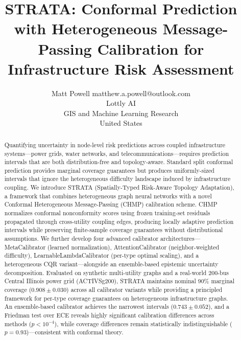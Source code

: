 \documentclass[twoside,11pt]{article}
\begin{document}
\title{STRATA: Conformal Prediction with Heterogeneous Message-Passing Calibration for Infrastructure Risk Assessment}

\author{\name Matt Powell \email matthew.a.powell@outlook.com \\
        \addr Lottly AI\\
        GIS and Machine Learning Research\\
        United States}


\maketitle

\begin{abstract}%
Quantifying uncertainty in node-level risk predictions across coupled infrastructure systems—power grids, water networks, and telecommunications—requires prediction intervals that are both distribution-free and topology-aware. Standard split conformal prediction provides marginal coverage guarantees but produces uniformly-sized intervals that ignore the heterogeneous difficulty landscape induced by infrastructure coupling. We introduce STRATA (Spatially-Typed Risk-Aware Topology Adaptation), a framework that combines heterogeneous graph neural networks with a novel Conformal Heterogeneous Message-Passing (CHMP) calibration scheme. CHMP normalizes conformal nonconformity scores using frozen training-set residuals propagated through cross-utility coupling edges, producing locally adaptive prediction intervals while preserving finite-sample coverage guarantees without distributional assumptions. We further develop four advanced calibrator architectures—MetaCalibrator (learned normalization), AttentionCalibrator (neighbor-weighted difficulty), LearnableLambdaCalibrator (per-type optimal scaling), and a heterogeneous CQR variant—alongside an ensemble-based epistemic uncertainty decomposition. Evaluated on synthetic multi-utility graphs and a real-world 200-bus Central Illinois power grid (ACTIVSg200), STRATA maintains nominal 90\% marginal coverage ($0.908 \pm 0.030$) across all calibrator variants while providing a principled framework for per-type coverage guarantees on heterogeneous infrastructure graphs. An ensemble-based calibrator achieves the narrowest intervals ($0.743 \pm 0.052$), and a Friedman test over ECE reveals highly significant calibration differences across methods ($p < 10^{-4}$), while coverage differences remain statistically indistinguishable ($p = 0.93$)—consistent with conformal theory.
\end{abstract}
\end{document}
